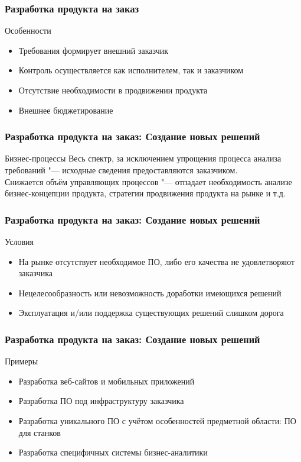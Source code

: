 \documentclass{../industrial-development}
\begin{document}
\begin{frame} \frametitle{Разработка продукта на заказ}
	\begin{block}{Особенности}
		\begin{itemize}
			\item Требования формирует внешний заказчик
			\item Контроль осуществляется как исполнителем, так и заказчиком
			\item Отсутствие необходимости в продвижении продукта
			\item Внешнее бюджетирование
		\end{itemize}
	\end{block}
\end{frame}
\lecturenotes


\begin{frame} \frametitle{Разработка продукта на заказ: Создание новых решений}
	\begin{block}{Бизнес-процессы}
		Весь спектр, за исключением упрощения процесса анализа требований "--- исходные сведения предоставляются заказчиком.\\
		Снижается объём управляющих процессов "--- отпадает необходимость анализе бизнес-концепции продукта, стратегии продвижения продукта на рынке и т.д.
	\end{block}
\end{frame}
\lecturenotes


\begin{frame} \frametitle{Разработка продукта на заказ: Создание новых решений}
	\begin{block}{Условия}
		\begin{itemize}
			\item На рынке отсутствует необходимое ПО, либо его качества не удовлетворяют заказчика
			\item Нецелесообразность или невозможность доработки имеющихся решений
			\item Эксплуатация и/или поддержка существующих решений слишком дорога
		\end{itemize}
	\end{block}
\end{frame}
\lecturenotes


\begin{frame} \frametitle{Разработка продукта на заказ: Создание новых решений}
	\begin{block}{Примеры}
		\begin{itemize}
			\item Разработка веб-сайтов и мобильных приложений
			\item Разработка ПО под инфраструктуру заказчика
			\item Разработка уникального ПО с учётом особенностей предметной области: ПО для станков
			\item Разработка специфичных системы бизнес-аналитики
		\end{itemize}
	\end{block}
\end{frame}
\lecturenotes
\end{document}
